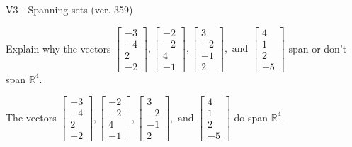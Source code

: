 \begin{exercise}
  \begin{exerciseTitle}V3 - Spanning sets (ver. 359)\end{exerciseTitle}
  \begin{exerciseStatement}
    Explain why the vectors \(\left[\begin{array}{r}
-3 \\
-4 \\
2 \\
-2
\end{array}\right] , \left[\begin{array}{r}
-2 \\
-2 \\
4 \\
-1
\end{array}\right] , \left[\begin{array}{r}
3 \\
-2 \\
-1 \\
2
\end{array}\right] , \text{ and } \left[\begin{array}{r}
4 \\
1 \\
2 \\
-5
\end{array}\right]\) span or don't span \(\mathbb{R}^4\). 
	


  \end{exerciseStatement}
  \begin{exerciseAnswer}
   The vectors \(\left[\begin{array}{r}
-3 \\
-4 \\
2 \\
-2
\end{array}\right] , \left[\begin{array}{r}
-2 \\
-2 \\
4 \\
-1
\end{array}\right] , \left[\begin{array}{r}
3 \\
-2 \\
-1 \\
2
\end{array}\right] , \text{ and } \left[\begin{array}{r}
4 \\
1 \\
2 \\
-5
\end{array}\right]\) 
  	 do  
	span \(\mathbb{R}^4\).
  


  \end{exerciseAnswer}
\end{exercise}